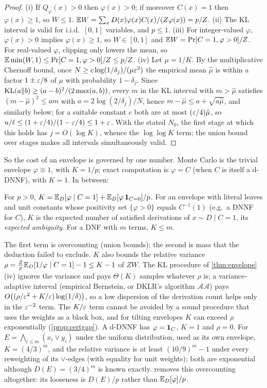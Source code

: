 \begin{proof}
(i) If $Q_\varphi(x)>0$ then $\varphi(x)>0$; if moreover $C(x)=1$ then
$\varphi(x)\ge1$, so $W\le1$. $\mathbb{E} W=\sum_xD(x)\varphi(x)C(x)/(Z\varphi(x))=p/Z$.
(ii) The KL interval is valid for i.i.d.\ $[0,1]$ variables, and $p\le1$.
(iii) For integer-valued $\varphi$, $\varphi(x)>0$ implies $\varphi(x)\ge1$, so
$W\in[0,1]$ and $\mathbb{E} W=\Pr[C=1,\varphi>0]/Z$. For real-valued $\varphi$, clipping
only lowers the mean, so $\mathbb{E}\min(W,1)\le\Pr[C=1,\varphi>0]/Z\le p/Z$.
(iv) Let $\mu=1/K$. By the multiplicative Chernoff bound, once
$N\ge c\log(1/\delta_j)/(\mu\varepsilon^2)$ the empirical mean $\hat\mu$ is within a factor
$1\pm\varepsilon/8$ of $\mu$ with probability $1-\delta_j$. Since
$\mathrm{KL}(a\|b)\ge(a-b)^2/(2\max(a,b))$, every $m$ in the KL interval with $m>\hat\mu$
satisfies $(m-\hat\mu)^2\le am$ with $a=2\log(2/\delta_j)/N$, hence
$m-\hat\mu\le a+\sqrt{a\hat\mu}$, and similarly below; for a suitable constant $c$
both are at most $(\varepsilon/4)\hat\mu$, so $u/\ell\le(1+\varepsilon/4)/(1-\varepsilon/4)\le1+\varepsilon$. With
the stated $N_0$, the first stage at which this holds has $j=O(\log K)$, whence the
$\log\log K$ term; the union bound over stages makes all intervals simultaneously
valid.
\end{proof}

So the cost of an envelope is governed by one number. Monte Carlo is the
trivial envelope $\varphi\equiv1$, with $K=1/p$; exact computation is $\varphi=C$
(when $C$ is itself a d-DNNF), with $K=1$. In between:

\begin{lemma}\label{lem:K}
For $p>0$, $K=\mathbb{E}_D[\varphi\mid C=1]+\mathbb{E}_D[\varphi\,\mathbf{1}_{C=0}]/p$. For an envelope
with literal leaves and unit constants whose positivity set $\{\varphi>0\}$ equals
$C^{-1}(1)$ (e.g.\ a DNNF for $C$), $K$ is the expected number of satisfied
derivations of $x\sim D\mid C=1$, its \emph{expected ambiguity}. For a DNF with
$m$ terms, $K\le m$.
\end{lemma}

The first term is overcounting (union bounds); the second is mass that the
deduction failed to exclude. $K$ also bounds the relative variance
$\rho=\frac{Z}{p}\mathbb{E}_D[1/\varphi\mid C=1]-1\le K-1$ of $ZW$. The KL procedure of
\cref{thm:envelope}(iv) ignores the variance and pays $\Theta(K)$ samples whatever
$\rho$ is; a variance-adaptive interval (empirical Bernstein, or DKLR's algorithm
$\mathcal{AA}$) pays $O\big((\rho/\varepsilon^2+K/\varepsilon)\log(1/\delta)\big)$, so a low dispersion
of the derivation count helps only in the $\varepsilon^{-2}$ term. The $K/\varepsilon$ term cannot
be avoided by a sound procedure that uses the weights as a black box, and for tilting
envelopes $K$ can exceed $\rho$ exponentially (\cref{prop:certgap}). A d-DNNF has
$\varphi=\mathbf{1}_C$, $K=1$ and $\rho=0$. For $E=\bigwedge_{i\le m}(x_i\vee y_i)$ under the uniform
distribution, used as its own envelope, $K=(4/3)^m$, and the relative variance is at
least $(10/9)^m-1$ under every reweighting of its $\vee$-edges (with equality for unit
weights); both are exponential although $D(E)=(3/4)^m$ is known exactly.
 removes this overcounting altogether: its looseness is $D(E)/p$ rather
than $\mathbb{E}_D[\varphi]/p$.

